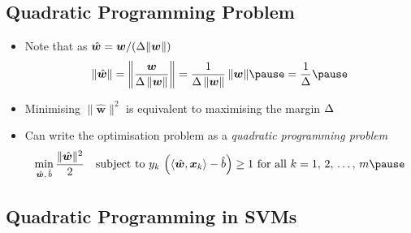 \begin{slide}
\section{Quadratic Programming Problem}

\begin{PauseHighLight}
  \begin{itemize}
  \item Note that as $\hat{\bm{w}}=\bm{w}/(\Delta\|\bm{w}\|)$
    \begin{align*}
      \| \hat{\bm{w}} \| = \left\|\frac{\bm{w}}{\margin\,\|\bm{w}\|}\right\|
      = \frac{1}{\margin\,\|\bm{w}\|} \, \|\bm{w}\| \pause
      = \frac{1}{\margin}\pause
    \end{align*}
  \item Minimising $\| \hat{\bm{w}} \|^2$ is equivalent to maximising the
    margin $\Delta$\pause
  \item Can write the optimisation problem as a \textit{quadratic
      programming problem}
    \begin{align*}
      \min_{\hat{\bm{w}},\,\hat{b}} \frac{\|\hat{\bm{w}}\|^2}{2} \quad 
      \mbox{subject to $y_k\,\left( \inner{\hat{\bm{w}}}{\bm{x}_k} -
      \hat{b}\right) \geq 1$ for all $k=1,\,2,\,\ldots,\,m$}\pause
    \end{align*}
  \end{itemize}
\end{PauseHighLight}

\end{slide}



\begin{slide}
\section[-2]{Quadratic Programming in SVMs}

\pb\pause{}
\begin{center}
  \pause
\end{center}
\end{slide}



